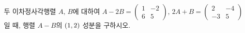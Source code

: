 두 이차정사각행렬 $A$, $B$에 대하여 $A-2B=\begin{pmatrix} 1 & -2 \\ 6 & 5 \end{pmatrix}$, $2A+B=\begin{pmatrix} 2 & -4 \\ -3 & 5 \end{pmatrix}$일 때, 행렬 $A-B$의 $(1{,}\mkern3mu\mathopen{}2)$ 성분을 구하시오.
